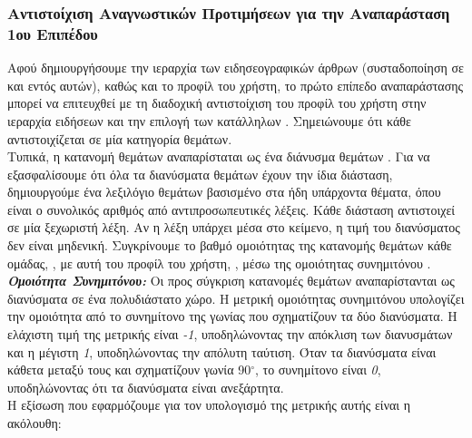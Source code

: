{{{{{{{{%
\subsubsection{Αντιστοίχιση Αναγνωστικών Προτιμήσεων για την Αναπαράσταση 1ου Επιπέδου} 
Αφού δημιουργήσουμε την ιεραρχία των ειδησεογραφικών άρθρων (συσταδοποίηση σε {} και {} εντός αυτών), 
καθώς και το προφίλ του χρήστη, 
το πρώτο επίπεδο αναπαράστασης μπορεί να επιτευχθεί με τη διαδοχική αντιστοίχιση του προφίλ του χρήστη στην ιεραρχία ειδήσεων 
και την επιλογή των κατάλληλων {}. 
Σημειώνουμε ότι κάθε {} αντιστοιχίζεται σε μία κατηγορία θεμάτων. \\

Τυπικά, η κατανομή θεμάτων αναπαρίσταται ως ένα διάνυσμα θεμάτων {}. 
Για να εξασφαλίσουμε ότι όλα τα διανύσματα θεμάτων έχουν την ίδια διάσταση, δημιουργούμε 
ένα λεξιλόγιο θεμάτων {} βασισμένο στα ήδη υπάρχοντα θέματα, όπου {} 
είναι ο συνολικός αριθμός από αντιπροσωπευτικές λέξεις. 
Κάθε διάσταση αντιστοιχεί σε μία ξεχωριστή λέξη. Αν η λέξη υπάρχει μέσα στο κείμενο, η τιμή του διανύσματος δεν είναι μηδενική. 
Συγκρίνουμε το βαθμό ομοιότητας της κατανομής θεμάτων κάθε ομάδας, {}, με αυτή του προφίλ του χρήστη, {}, 
μέσω της ομοιότητας συνημιτόνου {} \cite{Cs01}. \\

{\textbf {\textit{Ομοιότητα  Συνημιτόνου:}}} 
Οι προς σύγκριση κατανομές θεμάτων αναπαρίστανται ως διανύσματα σε ένα πολυδιάστατο χώρο. 
Η μετρική ομοιότητας συνημιτόνου υπολογίζει την ομοιότητα από το συνημίτονο της γωνίας που σχηματίζουν 
τα δύο διανύσματα. Η ελάχιστη τιμή της μετρικής είναι {\textit{-1}}, υποδηλώνοντας την απόκλιση 
των διανυσμάτων και η μέγιστη {\textit{1}}, υποδηλώνοντας την απόλυτη ταύτιση. 
Όταν τα διανύσματα είναι κάθετα μεταξύ τους και σχηματίζουν γωνία 90$^{\circ}$, το συνημίτονο είναι {\textit{0}}, 
υποδηλώνοντας ότι τα διανύσματα είναι ανεξάρτητα. \\

Η εξίσωση που εφαρμόζουμε για τον υπολογισμό της μετρικής αυτής είναι η ακόλουθη:

}}}}}}}}
